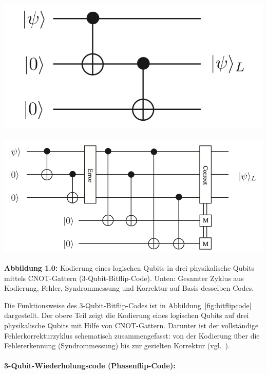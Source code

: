 \begin{center}
  \includegraphics[width=0.75\linewidth]{images/error-correction/Abb1_BitFlipCode_1.png}

  \vspace{1.2em}

  \includegraphics[width=\linewidth]{images/error-correction/Abb2_BitFlipCode_2.png}

  \par\vspace{0.5em}
  \textbf{Abbildung 1.0:}  Kodierung eines logischen Qubits in drei physikalische Qubits mittels CNOT-Gattern (3-Qubit-Bitflip-Code).
  Unten: Gesamter Zyklus aus Kodierung, Fehler, Syndrommessung und Korrektur auf Basis desselben Codes.
  \label{fig:bitflipcode}
\end{center}

Die Funktionsweise des 3-Qubit-Bitflip-Codes ist in Abbildung~\ref{fig:bitflipcode} dargestellt.
Der obere Teil zeigt die Kodierung eines logischen Qubits auf drei physikalische Qubits mit Hilfe von CNOT-Gattern.
Darunter ist der vollständige Fehlerkorrekturzyklus schematisch zusammengefasst: von der Kodierung über die Fehlererkennung (Syndrommessung) bis zur gezielten Korrektur (vgl.~\cite[8]{devitt_quantum_2013}).

\paragraph{3-Qubit-Wiederholungscode (Phasenflip-Code):}\label{chap:QEC1.4}


